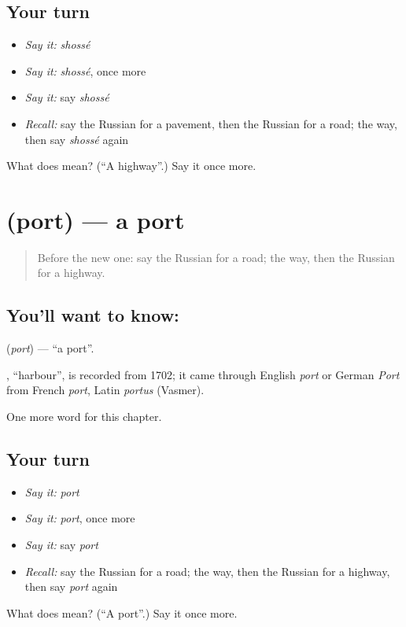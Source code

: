 \subsection*{Your turn}
\begin{itemize}
\raggedright
  \item \emph{Say it:} \emph{shossé}
  \item \emph{Say it:} \emph{shossé}, once more
  \item \emph{Say it:} say \emph{shossé}
  \item \emph{Recall:} say the Russian for a pavement, then the Russian for a road; the way, then say \emph{shossé} again
\end{itemize}

\begin{tcolorbox}[breakable,colback=teal!4,colframe=teal!35!black,title={Before you move on}]
What does  mean? (\textquotedblleft{}A highway\textquotedblright{}.) Say it once more.
\end{tcolorbox}
\section[\texorpdfstring{\ru{порт} (port)}{порт (port)}]{ (port) — a port}

\label{lesson:RU-C183-port}



\begin{quote}
Before the new one: say the Russian for a road; the way, then the Russian for a highway.
\end{quote}

\subsection*{You'll want to know: }
\textbf{} (\emph{port}) — \textquotedblleft{}a port\textquotedblright{}.

\begin{cousinweb}
\textbf{}, \textquotedblleft{}harbour\textquotedblright{}, is recorded from 1702; it came through English \emph{port} or German \emph{Port} from French \emph{port}, Latin \emph{portus} (Vasmer).
\end{cousinweb}

\begin{grammarlens}[title={What you've built}]
One more word for this chapter.
\end{grammarlens}

\subsection*{Your turn}
\begin{itemize}
\raggedright
  \item \emph{Say it:} \emph{port}
  \item \emph{Say it:} \emph{port}, once more
  \item \emph{Say it:} say \emph{port}
  \item \emph{Recall:} say the Russian for a road; the way, then the Russian for a highway, then say \emph{port} again
\end{itemize}

\begin{tcolorbox}[breakable,colback=teal!4,colframe=teal!35!black,title={Before you move on}]
What does  mean? (\textquotedblleft{}A port\textquotedblright{}.) Say it once more.
\end{tcolorbox}
